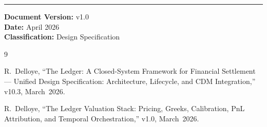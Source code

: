\documentclass[11pt,a4paper]{article}
\begin{document}
\vspace{2em}
\noindent\rule{\textwidth}{0.4pt}

\noindent\textbf{Document Version:} v1.0\\
\textbf{Date:} April 2026\\
\textbf{Classification:} Design Specification

\clearpage
\begin{thebibliography}{9}

R.~Delloye, ``The Ledger: A Closed-System Framework for Financial Settlement --- Unified Design Specification: Architecture, Lifecycle, and CDM Integration,'' v10.3, March~2026.

R.~Delloye, ``The Ledger Valuation Stack: Pricing, Greeks, Calibration, PnL Attribution, and Temporal Orchestration,'' v1.0, March~2026.

\end{thebibliography}
\end{document}
